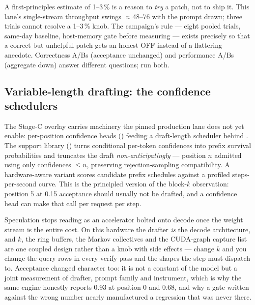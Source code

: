 \begin{hblesson}
A first-principles estimate of 1--3\,\% is a reason to \emph{try} a patch,
not to ship it. This lane's single-stream throughput swings
$\approx$48--76 \tokspersec{} with the prompt drawn; three trials cannot resolve a
1--3\,\% knob. The campaign's rule --- eight pooled trials, same-day
baseline, host-memory gate before measuring --- exists precisely so that a
correct-but-unhelpful patch gets an honest OFF instead of a flattering
anecdote. Correctness A/Bs (acceptance unchanged) and performance A/Bs
(aggregate down) answer different questions; run both.
\end{hblesson}

\subsection{Variable-length drafting: the confidence schedulers}

The Stage-C overlay carries machinery the pinned production lane does not yet
enable: per-position confidence heads
() feeding a draft-length
scheduler behind . The support
library () turns
conditional per-token confidences into prefix survival probabilities and
truncates the draft \emph{non-anticipatingly} --- position $n$ admitted
using only confidences $\le n$, preserving rejection-sampling compatibility.
A hardware-aware variant scores candidate prefix schedules
against a profiled steps-per-second curve. This is the principled version of
the block-$k$ observation: position 5 at 0.15 acceptance should usually not
be drafted, and a confidence head can make that call per request per step.

Speculation stops reading as an accelerator bolted onto decode once the
weight stream is the entire cost. On this hardware the drafter \emph{is} the
decode architecture, and $k$, the ring buffers, the Markov collectives and
the CUDA-graph capture list are one coupled design rather than a knob with
side effects --- change $k$ and you change the query rows in every verify
pass and the shapes the step must dispatch to. Acceptance changed character
too: it is not a constant of the model but a joint measurement of drafter,
prompt family and instrument, which is why the same engine honestly reports
0.93 at position 0 and 0.68, and why a gate written against the wrong number
nearly manufactured a regression that was never there.

